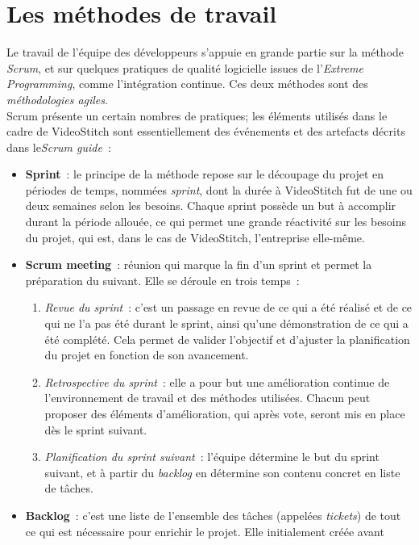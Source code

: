 \section{Les méthodes de travail}
Le travail de l'équipe des développeurs s'appuie en grande partie sur la méthode \emph{Scrum}, et
sur quelques pratiques de qualité logicielle issues de l'\textit{Extreme Programming}, comme l'intégration continue.
Ces deux méthodes sont des \emph{méthodologies agiles}\cite{methode-agile}.\\
\newline
Scrum présente un certain nombres de pratiques; les éléments utilisés 
dans le cadre de VideoStitch sont essentiellement des événements et des artefacts 
décrits dans le\textit{Scrum guide}\cite{scrum-guide}~:
\begin{itemize}
  \item \textbf{Sprint}~: le principe de la méthode repose sur le découpage du projet en 
	périodes de temps, nommées \emph{sprint}, dont la durée à VideoStitch fut de 
	une ou deux semaines selon les besoins. Chaque sprint possède un but à accomplir 
	durant la période allouée, ce qui permet une grande réactivité sur les besoins 
	du projet, qui est, dans le cas de VideoStitch, l'entreprise elle-même.
	\item \textbf{Scrum meeting}~: réunion qui marque la fin d'un sprint et permet la préparation 
	du suivant. Elle se déroule en trois temps~:
	\begin{enumerate}
		\item \textit{Revue du sprint}~: c'est un passage en revue de ce qui a été réalisé
		et de ce qui ne l'a pas été durant le sprint, ainsi qu'une démonstration 
		de ce qui a été complété. Cela permet de valider l'objectif et d'ajuster 
		la planification du projet en fonction de son avancement.
		\item \textit{Retrospective du sprint}~: elle a pour but une amélioration continue 
		de l'environnement de travail et des méthodes utilisées. Chacun peut proposer
		des éléments d'amélioration, qui après vote, seront mis en place dès le sprint
		suivant.
		\item \textit{Planification du sprint suivant}~: l'équipe détermine le but du sprint
		suivant, et à partir du \textit{backlog} en détermine son contenu concret en liste de tâches.
	\end{enumerate}
  \item \textbf{Backlog}~: c'est une liste de l'ensemble des tâches (appelées \emph{tickets})
  de tout ce qui est nécessaire pour enrichir le projet. Elle initialement créée avant

\end{itemize}
